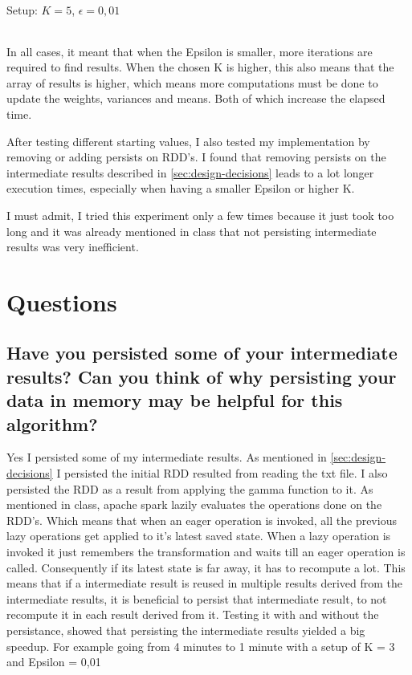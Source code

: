 \documentclass{article}
\begin{document}
Setup: $K = 5$, $\epsilon = 0,01$
\begin{table}
	\begin{tabularx}{\textwidth}{
		|>{\raggedright\arraybackslash}X
		|>{\raggedright\arraybackslash}X
		|>{\raggedright\arraybackslash}X
		|>{\raggedright\arraybackslash}X
		|>{\raggedright\arraybackslash}X
		|>{\raggedright\arraybackslash}X|
		}
		\hline
		\hline
	\end{tabularx}
\end{table}
In all cases, it meant that when the Epsilon is smaller, more iterations are required to find results.
When the chosen K is higher, this also means that the array of results is higher, which means more computations must be done to update the weights, variances and means. Both of which increase the elapsed time.
\par
After testing different starting values, I also tested my implementation by removing or adding persists on RDD's. I found that removing persists on the intermediate results described in \ref{sec:design-decisions} leads to a lot longer execution times, especially when having a smaller Epsilon or higher K.
\par
I must admit, I tried this experiment only a few times because it just took too long and it was already mentioned in class that not persisting intermediate results was very inefficient.
\par
\section{Questions}
\subsection{Have you persisted some of your intermediate results? Can you think of why persisting
	your data in memory may be helpful for this algorithm?}
Yes I persisted some of my intermediate results.
As mentioned in \ref{sec:design-decisions} I persisted the initial RDD resulted from reading the txt file.
I also persisted the RDD as a result from applying the gamma function to it.
As mentioned in class, apache spark lazily evaluates the operations done on the RDD's.
Which means that when an eager operation is invoked, all the previous lazy operations get applied to it's latest saved state.
When a lazy operation is invoked it just remembers the transformation and waits till an eager operation is called.
Consequently if its latest state is far away, it has to recompute a lot. This means that if a intermediate result is reused in multiple results derived from the intermediate results, it is beneficial to persist that intermediate result, to not recompute it in each result derived from it. Testing it with and without the persistance, showed that persisting the intermediate results yielded a big speedup. For example going from 4 minutes to 1 minute with a setup of K = 3 and Epsilon = 0,01
\end{document}
